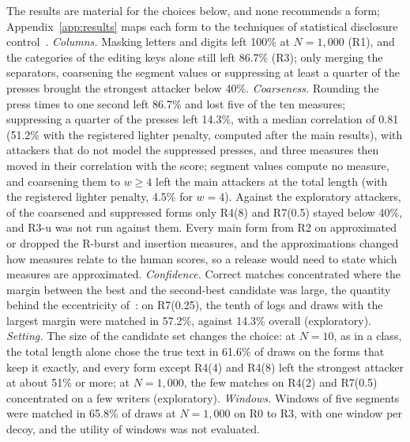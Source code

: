 The results are material for the choices below, and none recommends a form; Appendix~\ref{app:results} maps each
form to the techniques of statistical disclosure control~\cite{hundepool2026handbook}. \emph{Columns.} Masking letters and digits left
100\% at $N = 1{,}000$ (R1), and the categories of the editing keys alone still left 86.7\% (R3); only merging the
separators, coarsening the segment values or suppressing at least a quarter of the presses brought the strongest
attacker below 40\%. \emph{Coarseness.} Rounding the press times to one second left
86.7\% and lost five of the ten measures; suppressing a quarter of the presses left 14.3\%, with a median correlation
of 0.81 (51.2\% with the registered lighter penalty, computed after the main results), with attackers that do not model the suppressed presses, and
three measures then moved in their correlation with the score; segment values compute no measure, and coarsening them
to $w \geq 4$ left the main attackers at the total length (with the registered lighter penalty, 4.5\% for $w = 4$).
Against the exploratory attackers, of the coarsened and suppressed forms only R4(8) and R7(0.5) stayed below 40\%, and
R3-u was not run against them. Every main form from R2 on
approximated or dropped the R-burst and insertion measures, and the approximations changed how measures relate to the
human scores, so a release would need to state which measures are approximated. \emph{Confidence.} Correct matches
concentrated where the margin between the best and the second-best candidate was large, the quantity behind the
eccentricity of~\cite{narayanan2008robust}: on R7(0.25), the tenth of logs and draws with the largest margin were
matched in 57.2\%, against 14.3\% overall (exploratory). \emph{Setting.} The size of the candidate set changes the choice: at $N = 10$, as in a class, the total
length alone chose the true text in 61.6\% of draws on the forms that keep it exactly, and every form except R4(4) and
R4(8) left the strongest attacker at about 51\% or more; at $N = 1{,}000$, the few matches on R4(2) and R7(0.5)
concentrated on a few writers (exploratory). \emph{Windows.}
Windows of five segments were matched in 65.8\% of draws at $N = 1{,}000$ on R0 to R3, with one window per decoy, and
the utility of windows was not evaluated.
